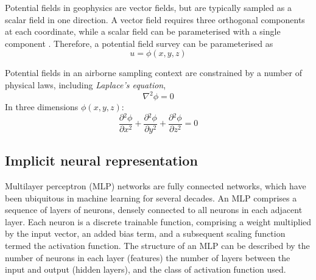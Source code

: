 \documentclass[manuscript.tex]{subfiles}
\begin{document}
\label{sec:geo_physics}
Potential fields in geophysics are vector fields, but are typically sampled as a scalar field in one direction.
A vector field requires three orthogonal components at each coordinate, while a scalar field can be parameterised with a single component \parencite{blakelyPotentialTheoryGravity1996}.
Therefore, a potential field survey can be parameterised as
\begin{equation}
    u = \phi\left(x,y,z\right)
\end{equation}


Potential fields in an airborne sampling context are constrained by a number of physical laws, including \emph{Laplace's equation},
\[
    \nabla^2 \phi = 0
\]
In three dimensions \( \phi\left(x,y,z\right) \):
\begin{equation}
    \label{eqn:Laplace}
    \frac{\partial{}^2\phi}{\partial{}x^2} + \frac{\partial{}^2\phi}{\partial{}y^2} + \frac{\partial{}^2\phi}{\partial{}z^2} = 0
\end{equation}



\subsection{Implicit neural representation}
\label{sec:inr}
Multilayer perceptron (MLP) networks are fully connected networks, which have been ubiquitous in machine learning for several decades.
An MLP comprises a sequence of layers of neurons, densely connected to all neurons in each adjacent layer.
Each neuron is a discrete trainable function, comprising a weight multiplied by the input vector, an added bias term, and a subsequent scaling function termed the activation function.
The structure of an MLP can be described by the number of neurons in each layer (features) the number of layers between the input and output (hidden layers), and the class of activation function used.
\end{document}

